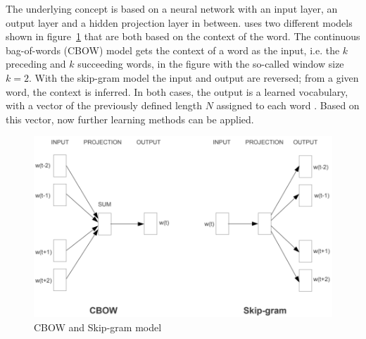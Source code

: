 \documentclass[article,type=msc,colorback,accentcolor=tud7b]{tudthesis}
\begin{document}
    The underlying concept is based on a neural network with an input layer, an output layer and a hidden projection layer in between. \citeauthor{Mikolov2013} uses two different models shown in figure~\ref{fig:word_embeddings} that are both based on the context of the word. The continuous bag-of-words (CBOW) model gets the context of a word as the input, i.e. the $k$ preceding and $k$ succeeding words, in the figure with the so-called window size $k=2$. With the skip-gram model the input and output are reversed; from a given word, the context is inferred. In both cases, the output is a learned vocabulary, with a vector of the previously defined length $N$ assigned to each word \autocite{Mikolov2013}. Based on this vector, now further learning methods can be applied.
 
    \begin{figure}[H]
      \centering
      \includegraphics[scale=0.75]{images/word_embeddings}
      \caption[CBOW and Skip-gram model]{CBOW and Skip-gram model \autocite{Mikolov2013}}
      \label{fig:word_embeddings}
    \end{figure}
    
\end{document}
